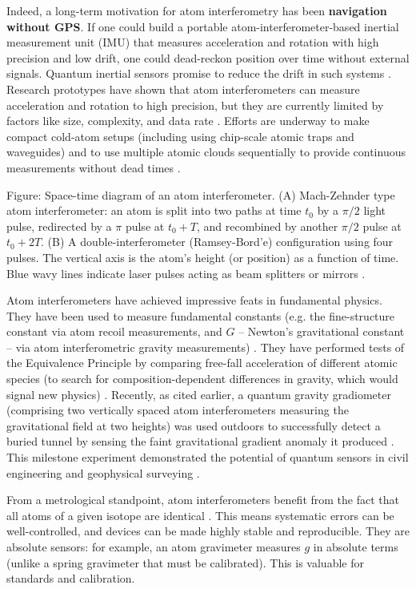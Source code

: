 Indeed, a long-term motivation for atom interferometry has been
\textbf{navigation without GPS}. If one could build a portable
atom-interferometer-based inertial measurement unit (IMU) that
measures acceleration and rotation with high precision and low drift,
one could dead-reckon position over time without external
signals. Quantum inertial sensors promise to reduce the drift in such
systems . Research prototypes have shown that atom interferometers can
measure acceleration and rotation to high precision, but they are
currently limited by factors like size, complexity, and data rate
. Efforts are underway to make compact cold-atom setups (including
using chip-scale atomic traps and waveguides) and to use multiple
atomic clouds sequentially to provide continuous measurements without
dead times .



Figure: Space-time diagram of an atom interferometer. (A) Mach-Zehnder type atom interferometer: an atom is split into two paths at time $t_0$ by a $\pi/2$ light pulse, redirected by a $\pi$ pulse at $t_0+T$, and recombined by another $\pi/2$ pulse at $t_0+2T$. (B) A double-interferometer (Ramsey-Bord'e) configuration using four pulses. The vertical axis is the atom’s height (or position) as a function of time. Blue wavy lines indicate laser pulses acting as beam splitters or mirrors .



Atom interferometers have achieved impressive feats in fundamental
physics. They have been used to measure fundamental constants
(e.g. the fine-structure constant via atom recoil measurements, and
$G$ – Newton’s gravitational constant – via atom interferometric
gravity measurements) . They have performed tests of the Equivalence
Principle by comparing free-fall acceleration of different atomic
species (to search for composition-dependent differences in gravity,
which would signal new physics) . Recently, as cited earlier, a
quantum gravity gradiometer (comprising two vertically spaced atom
interferometers measuring the gravitational field at two heights) was
used outdoors to successfully detect a buried tunnel by sensing the
faint gravitational gradient anomaly it produced . This milestone
experiment demonstrated the potential of quantum sensors in civil
engineering and geophysical surveying .



From a metrological standpoint, atom interferometers benefit from the
fact that all atoms of a given isotope are identical . This means
systematic errors can be well-controlled, and devices can be made
highly stable and reproducible. They are absolute sensors: for
example, an atom gravimeter measures $g$ in absolute terms (unlike a
spring gravimeter that must be calibrated). This is valuable for
standards and calibration.



